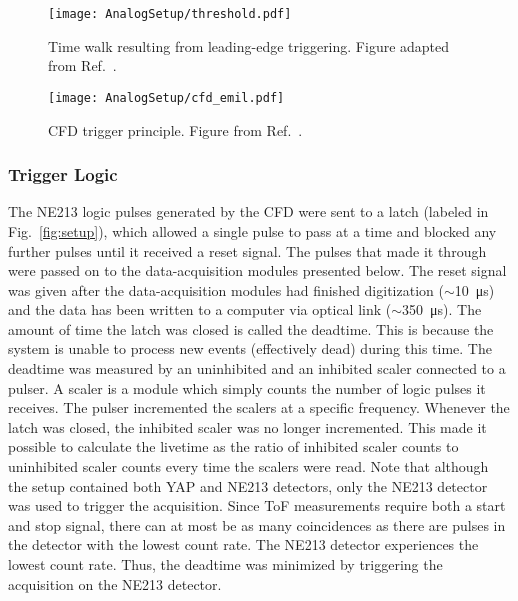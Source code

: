 \documentclass[main.tex]{subfiles}
\begin{document}
\begin{figure}[h]
    \centering
        \texttt{[image: AnalogSetup/threshold.pdf]}
        \caption[Time walk resulting from leading-edge triggering.]{Time walk resulting from leading-edge triggering. Figure adapted from Ref.~\cite{Rofors}.}
    \label{fig:discriminator}
\end{figure}

\begin{figure}[h]
    \centering
        \texttt{[image: AnalogSetup/cfd\_emil.pdf]}
        \caption[CFD trigger principle.]{CFD trigger principle. Figure from Ref.~\cite{Rofors}.}
    \label{fig:cfd}
\end{figure}



\subsubsection{Trigger Logic}
The NE213 logic pulses generated by the CFD were sent to a latch (labeled  in Fig.~\ref{fig:setup}), which allowed a single pulse to pass at a time and blocked any further pulses until it received a reset signal. The pulses that made it through were passed on to the data-acquisition modules presented below. The reset signal was given after the data-acquisition modules had finished digitization ($\sim$\SI{10}{\micro s}) and the data has been written to a computer via optical link ($\sim$\SI{350}{\micro s}). The amount of time the latch was closed is called the deadtime. This is because the system is unable to process new events (effectively dead) during this time. The deadtime was measured by an uninhibited and an inhibited scaler connected to a pulser. A scaler is a module which simply counts the number of logic pulses it receives. The pulser incremented the scalers at a specific frequency. Whenever the latch was closed, the inhibited scaler was no longer incremented. This made it possible to calculate the livetime as the ratio of inhibited scaler counts to uninhibited scaler counts every time the scalers were read. Note that although the setup contained both YAP and NE213 detectors, only the NE213 detector was used to trigger the acquisition. Since ToF measurements require both a start and stop signal, there can at most be as many coincidences as there are pulses in the detector with the lowest count rate. The NE213 detector experiences the lowest count rate. Thus, the deadtime was minimized by triggering the acquisition on the NE213 detector.
\end{document}
